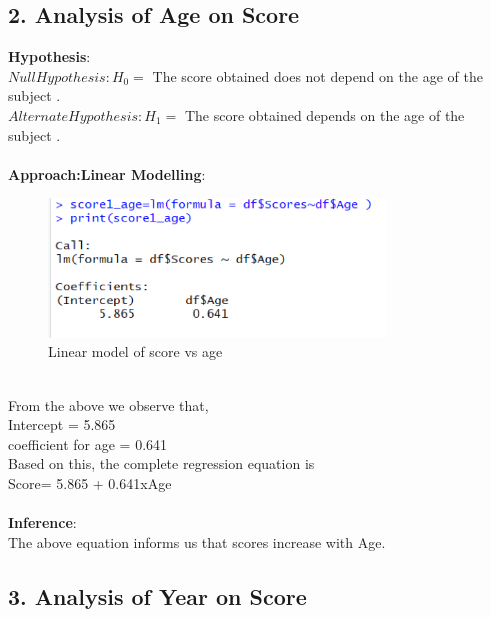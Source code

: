 \documentclass[12pt,epsf]{report}
\begin{document}
\subsection*{2. Analysis of Age on Score}

\textbf{Hypothesis}:\\
$Null Hypothesis : H_0 = $ The score obtained does not depend on the age of the subject .\\
$Alternate Hypothesis : H_1 = $ The score obtained depends on the age of the subject .\\
\\
\textbf{Approach:Linear Modelling}:\\
\begin{figure}[!ht]
	\centering
	\includegraphics[width=0.8\textwidth]{Picture2}
	\caption{Linear model of score vs age}
	\centering
\end{figure}
\\
From the above we observe that,\\
Intercept = 5.865 \\
coefficient for age = 0.641 \\
Based on this, the complete regression equation is \\
Score= 5.865 + 0.641xAge\\
\\
\textbf{Inference}:\\
The above equation informs us that scores increase with Age.\\

\subsection*{3. Analysis of Year on Score}
\end{document}
